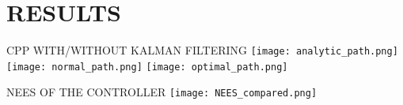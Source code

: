 %

\section{RESULTS}\label{sec:results}


\begin{RoyalFigure}[!htb, label=fig:coverage_wo_kalman]{CPP WITH/WITHOUT KALMAN FILTERING}
	\center
	\texttt{[image: analytic\_path.png]}
	\texttt{[image: normal\_path.png]}
	\texttt{[image: optimal\_path.png]}
\end{RoyalFigure}

\begin{RoyalFigure}[!htb, label=fig:NEES_kalman]{NEES OF THE CONTROLLER}
	\texttt{[image: NEES\_compared.png]}
\end{RoyalFigure}
